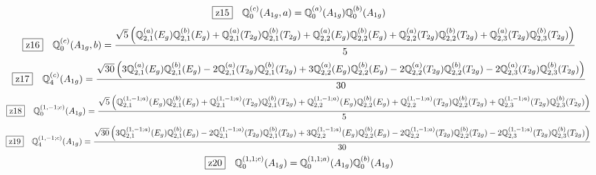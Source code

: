 \documentclass[fleqn,10pt,landscape]{jsarticle}
\begin{document}
\begin{dmath*}
\hspace*{3mm}\fbox{z15}\quad \mathbb{Q}_{0}^{(c)}(A_{1g},a)=\mathbb{Q}_{0}^{(a)}(A_{1g}) \mathbb{Q}_{0}^{(b)}(A_{1g})
\end{dmath*}
\begin{dmath*}
\hspace*{3mm}\fbox{z16}\quad \mathbb{Q}_{0}^{(c)}(A_{1g},b)=\frac{\sqrt{5} \left(\mathbb{Q}_{2,1}^{(a)}(E_{g}) \mathbb{Q}_{2,1}^{(b)}(E_{g}) + \mathbb{Q}_{2,1}^{(a)}(T_{2g}) \mathbb{Q}_{2,1}^{(b)}(T_{2g}) + \mathbb{Q}_{2,2}^{(a)}(E_{g}) \mathbb{Q}_{2,2}^{(b)}(E_{g}) + \mathbb{Q}_{2,2}^{(a)}(T_{2g}) \mathbb{Q}_{2,2}^{(b)}(T_{2g}) + \mathbb{Q}_{2,3}^{(a)}(T_{2g}) \mathbb{Q}_{2,3}^{(b)}(T_{2g})\right)}{5}
\end{dmath*}
\begin{dmath*}
\hspace*{3mm}\fbox{z17}\quad \mathbb{Q}_{4}^{(c)}(A_{1g})=\frac{\sqrt{30} \left(3 \mathbb{Q}_{2,1}^{(a)}(E_{g}) \mathbb{Q}_{2,1}^{(b)}(E_{g}) - 2 \mathbb{Q}_{2,1}^{(a)}(T_{2g}) \mathbb{Q}_{2,1}^{(b)}(T_{2g}) + 3 \mathbb{Q}_{2,2}^{(a)}(E_{g}) \mathbb{Q}_{2,2}^{(b)}(E_{g}) - 2 \mathbb{Q}_{2,2}^{(a)}(T_{2g}) \mathbb{Q}_{2,2}^{(b)}(T_{2g}) - 2 \mathbb{Q}_{2,3}^{(a)}(T_{2g}) \mathbb{Q}_{2,3}^{(b)}(T_{2g})\right)}{30}
\end{dmath*}
\begin{dmath*}
\hspace*{3mm}\fbox{z18}\quad \mathbb{Q}_{0}^{(1,-1;c)}(A_{1g})=\frac{\sqrt{5} \left(\mathbb{Q}_{2,1}^{(1,-1;a)}(E_{g}) \mathbb{Q}_{2,1}^{(b)}(E_{g}) + \mathbb{Q}_{2,1}^{(1,-1;a)}(T_{2g}) \mathbb{Q}_{2,1}^{(b)}(T_{2g}) + \mathbb{Q}_{2,2}^{(1,-1;a)}(E_{g}) \mathbb{Q}_{2,2}^{(b)}(E_{g}) + \mathbb{Q}_{2,2}^{(1,-1;a)}(T_{2g}) \mathbb{Q}_{2,2}^{(b)}(T_{2g}) + \mathbb{Q}_{2,3}^{(1,-1;a)}(T_{2g}) \mathbb{Q}_{2,3}^{(b)}(T_{2g})\right)}{5}
\end{dmath*}
\begin{dmath*}
\hspace*{3mm}\fbox{z19}\quad \mathbb{Q}_{4}^{(1,-1;c)}(A_{1g})=\frac{\sqrt{30} \left(3 \mathbb{Q}_{2,1}^{(1,-1;a)}(E_{g}) \mathbb{Q}_{2,1}^{(b)}(E_{g}) - 2 \mathbb{Q}_{2,1}^{(1,-1;a)}(T_{2g}) \mathbb{Q}_{2,1}^{(b)}(T_{2g}) + 3 \mathbb{Q}_{2,2}^{(1,-1;a)}(E_{g}) \mathbb{Q}_{2,2}^{(b)}(E_{g}) - 2 \mathbb{Q}_{2,2}^{(1,-1;a)}(T_{2g}) \mathbb{Q}_{2,2}^{(b)}(T_{2g}) - 2 \mathbb{Q}_{2,3}^{(1,-1;a)}(T_{2g}) \mathbb{Q}_{2,3}^{(b)}(T_{2g})\right)}{30}
\end{dmath*}
\begin{dmath*}
\hspace*{3mm}\fbox{z20}\quad \mathbb{Q}_{0}^{(1,1;c)}(A_{1g})=\mathbb{Q}_{0}^{(1,1;a)}(A_{1g}) \mathbb{Q}_{0}^{(b)}(A_{1g})
\end{dmath*}
\end{document}
